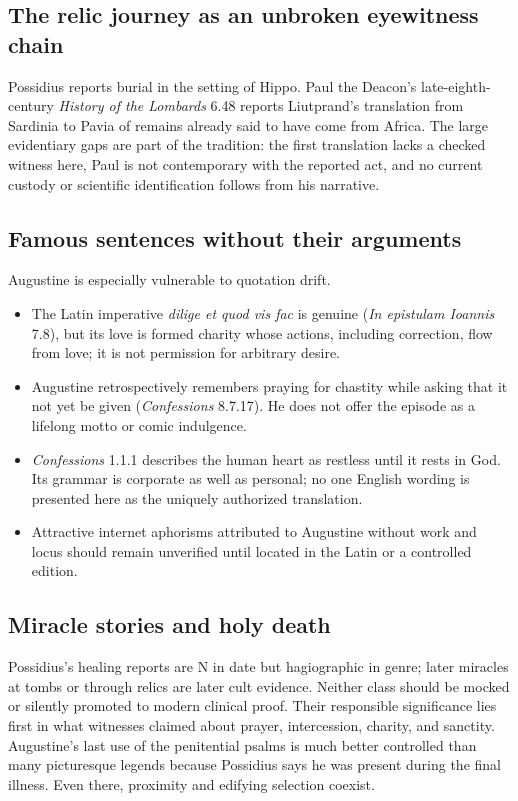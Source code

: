 \subsection{The relic journey as an unbroken eyewitness chain}

Possidius reports burial in the setting of Hippo. Paul the Deacon's
late-eighth-century \emph{History of the Lombards} 6.48 reports Liutprand's
translation from Sardinia to Pavia of remains already said to have come from
Africa. The large evidentiary gaps are part of the tradition: the first
translation lacks a checked witness here, Paul is not contemporary with the
reported act, and no current custody or scientific identification follows from
his narrative.

\subsection{Famous sentences without their arguments}

Augustine is especially vulnerable to quotation drift.

\begin{itemize}
\item The Latin imperative \emph{dilige et quod vis fac} is genuine
(\emph{In epistulam Ioannis} 7.8), but its love is formed charity whose actions,
including correction, flow from love; it is not permission for arbitrary
desire.
\item Augustine retrospectively remembers praying for chastity while asking
that it not yet be given (\emph{Confessions} 8.7.17). He does not offer the
episode as a lifelong motto or comic indulgence.
\item \emph{Confessions} 1.1.1 describes the human heart as restless until it
rests in God. Its grammar is corporate as well as personal; no one English
wording is presented here as the uniquely authorized translation.
\item Attractive internet aphorisms attributed to Augustine without work and
locus should remain unverified until located in the Latin or a controlled
edition.
\end{itemize}

\subsection{Miracle stories and holy death}

Possidius's healing reports are N in date but hagiographic in genre; later
miracles at tombs or through relics are later cult evidence. Neither class
should be mocked or silently promoted to modern clinical proof. Their
responsible significance lies first in what witnesses claimed about prayer,
intercession, charity, and sanctity. Augustine's last use of the penitential
psalms is much better controlled than many picturesque legends because
Possidius says he was present during the final illness. Even there, proximity
and edifying selection coexist.

